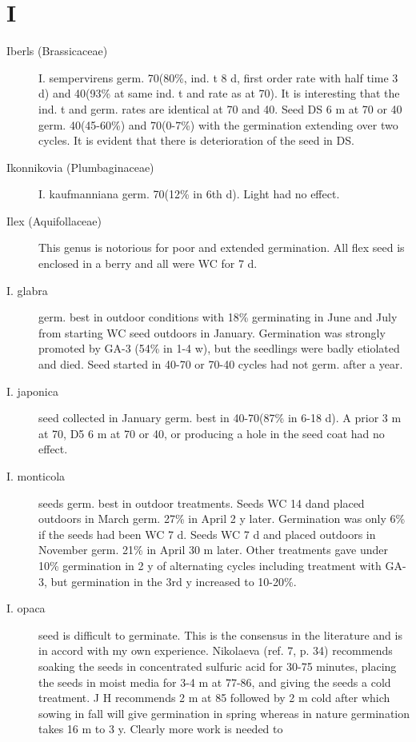 \section{I}
\begin{description}

\item[Iberls (Brassicaceae)] I. sempervirens germ. 70(80\%, ind. t 8 d, first order
rate with half time 3 d) and 40(93\% at same ind. t and rate as at 70). It is interesting
that the ind. t and germ. rates are identical at 70 and 40. Seed DS 6 m at 70 or 40
germ. 40(45-60\%) and 70(0-7\%) with the germination extending over two cycles. It is
evident that there is deterioration of the seed in DS.

\item[Ikonnikovia (Plumbaginaceae)] I. kaufmanniana germ. 70(12\% in 6th d).
Light had no effect.
\item[Ilex (Aquifollaceae)] This genus is notorious for poor and extended
germination. All flex seed is enclosed in a berry and all were WC for 7 d.
\item[I. glabra] germ. best in outdoor conditions with 18\% germinating in June and
July from starting WC seed outdoors in January. Germination was strongly promoted
by GA-3 (54\% in 1-4 w), but the seedlings were badly etiolated and died. Seed started
in 40-70 or 70-40 cycles had not germ. after a year.
\item[I. japonica] seed collected in January germ. best in 40-70(87\% in 6-18 d). A
prior 3 m at 70, D5 6 m at 70 or 40, or producing a hole in the seed coat had no effect.
\item[I. monticola] seeds germ. best in outdoor treatments. Seeds WC 14 dand
placed outdoors in March germ. 27\% in April 2 y later. Germination was only 6\% if the
seeds had been WC 7 d. Seeds WC 7 d and placed outdoors in November germ.
21\% in April 30 m later. Other treatments gave under 10\% germination in 2 y of
alternating cycles including treatment with GA-3, but germination in the 3rd y
increased to 10-20\%.
\item[I. opaca] seed is difficult to germinate. This is the consensus in the literature and
is in accord with my own experience. Nikolaeva (ref. 7, p. 34) recommends soaking
the seeds in concentrated sulfuric acid for 30-75 minutes, placing the seeds in moist
media for 3-4 m at 77-86, and giving the seeds a cold treatment. J H recommends 2 m
at 85 followed by 2 m cold after which sowing in fall will give germination in spring
whereas in nature germination takes 16 m to 3 y. Clearly more work is needed to

\end{description}
